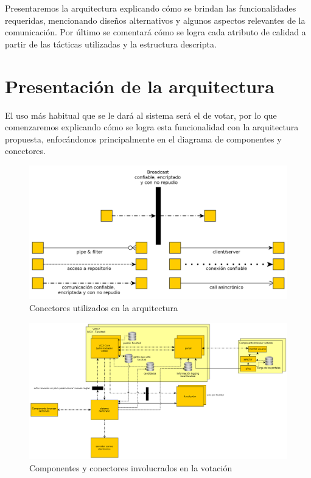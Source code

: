 

Presentaremos la arquitectura explicando cómo se brindan las funcionalidades requeridas, mencionando diseños alternativos y algunos aspectos relevantes de la comunicación. Por último se comentará cómo se logra cada atributo de calidad a partir de las tácticas utilizadas y la estructura descripta. 

\section{Presentación de la arquitectura}

El uso más habitual que se le dará al sistema será el de votar, por lo que comenzaremos explicando cómo se logra esta funcionalidad con la arquitectura propuesta, enfocándonos principalmente en el diagrama de componentes y conectores.

\begin{figure}[H]
	\begin{center}
		\includegraphics[scale=0.22]{../diagramas/tiposConector.png}
	\end{center} 
	\caption{Conectores utilizados en la arquitectura}
	\label{fig:tiposConector}
\end{figure}

\begin{figure}[H]
	\begin{center}
		\includegraphics[scale=0.18]{../diagramas/vistaPrincipal.png}
	\end{center} 
	\caption{Componentes y conectores involucrados en la votación}	
	\label{fig:vistaPrincipal}
\end{figure}


